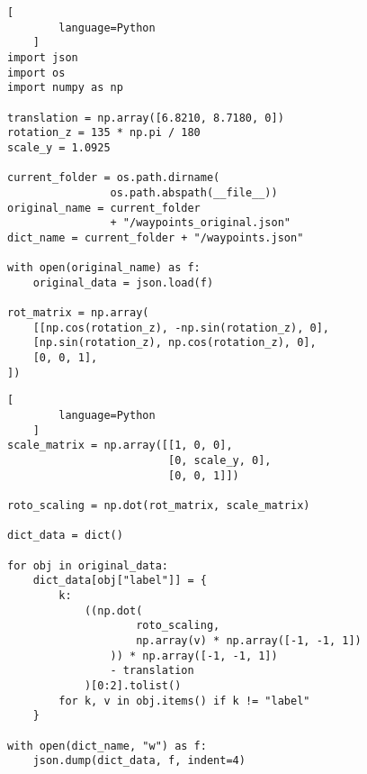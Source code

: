 \documentclass[epsfig,a4paper,11pt,titlepage,twoside,openany]{book}
\begin{document}
\begin{minipage}[h]{0.47\linewidth}
    \begin{lstlisting}[
        language=Python
    ]
import json
import os
import numpy as np

translation = np.array([6.8210, 8.7180, 0])
rotation_z = 135 * np.pi / 180
scale_y = 1.0925

current_folder = os.path.dirname(
                os.path.abspath(__file__))
original_name = current_folder 
                + "/waypoints_original.json"
dict_name = current_folder + "/waypoints.json"

with open(original_name) as f:
    original_data = json.load(f)

rot_matrix = np.array(
    [[np.cos(rotation_z), -np.sin(rotation_z), 0],
    [np.sin(rotation_z), np.cos(rotation_z), 0],
    [0, 0, 1],
])
    \end{lstlisting}
\end{minipage}
\begin{minipage}[h]{0.47\linewidth}
    \begin{lstlisting}[
        language=Python
    ]
scale_matrix = np.array([[1, 0, 0], 
                         [0, scale_y, 0],
                         [0, 0, 1]])

roto_scaling = np.dot(rot_matrix, scale_matrix)

dict_data = dict()

for obj in original_data:
    dict_data[obj["label"]] = {
        k: 
            ((np.dot(
                    roto_scaling,
                    np.array(v) * np.array([-1, -1, 1])
                )) * np.array([-1, -1, 1]) 
                - translation
            )[0:2].tolist()
        for k, v in obj.items() if k != "label"
    }

with open(dict_name, "w") as f:
    json.dump(dict_data, f, indent=4)
    \end{lstlisting}
\end{minipage}
\end{document}
